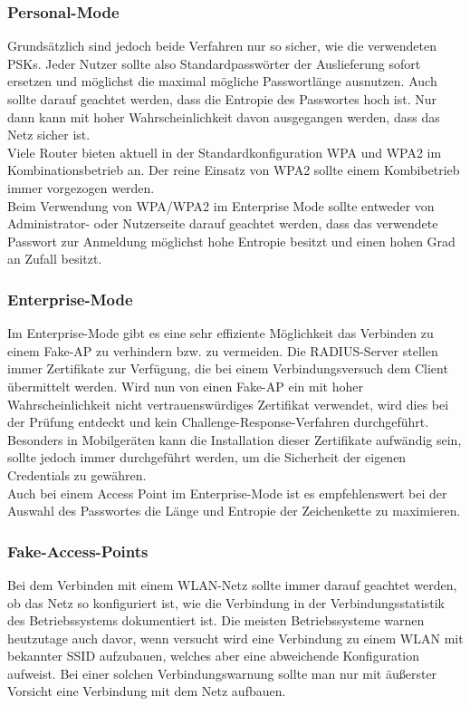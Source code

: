 \subsubsection{Personal-Mode}
Grundsätzlich sind jedoch beide Verfahren nur so sicher, wie die verwendeten PSKs. Jeder Nutzer sollte also Standardpasswörter der Auslieferung sofort ersetzen und möglichst die maximal mögliche Passwortlänge ausnutzen. Auch sollte darauf geachtet werden, dass die Entropie des Passwortes hoch ist. Nur dann kann mit hoher Wahrscheinlichkeit davon ausgegangen werden, dass das Netz sicher ist. \\
Viele Router bieten aktuell in der Standardkonfiguration WPA und WPA2 im Kombinationsbetrieb an. Der reine Einsatz von WPA2 sollte einem Kombibetrieb immer vorgezogen werden. \\
Beim Verwendung von WPA/WPA2 im Enterprise Mode sollte entweder von Administrator- oder Nutzerseite darauf geachtet werden, dass das verwendete Passwort zur Anmeldung möglichst hohe Entropie besitzt und einen hohen Grad an Zufall besitzt.
\subsubsection{Enterprise-Mode}
Im Enterprise-Mode gibt es eine sehr effiziente Möglichkeit das Verbinden zu einem Fake-AP zu verhindern bzw. zu vermeiden. Die RADIUS-Server stellen immer Zertifikate zur Verfügung, die bei einem Verbindungsversuch dem Client übermittelt werden. Wird nun von einen Fake-AP ein mit hoher Wahrscheinlichkeit nicht vertrauenswürdiges Zertifikat verwendet, wird dies bei der Prüfung entdeckt und kein Challenge-Response-Verfahren durchgeführt. Besonders in Mobilgeräten kann die Installation dieser Zertifikate aufwändig sein, sollte jedoch immer durchgeführt werden, um die Sicherheit der eigenen Credentials zu gewähren.\\
Auch bei einem Access Point im Enterprise-Mode ist es empfehlenswert bei der Auswahl des Passwortes die Länge und Entropie der Zeichenkette zu maximieren. 
\subsubsection{Fake-Access-Points}
Bei dem Verbinden mit einem WLAN-Netz sollte immer darauf geachtet werden, ob das Netz so konfiguriert ist, wie die Verbindung in der Verbindungsstatistik des Betriebssystems dokumentiert ist. Die meisten Betriebssysteme warnen heutzutage auch davor, wenn versucht wird eine Verbindung zu einem WLAN mit bekannter SSID aufzubauen, welches aber eine abweichende Konfiguration aufweist. Bei einer solchen Verbindungswarnung sollte man nur mit äußerster Vorsicht eine Verbindung mit dem Netz aufbauen.
